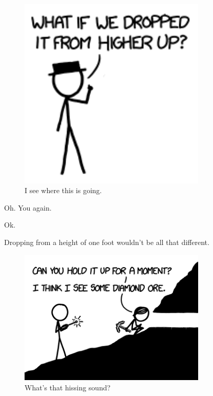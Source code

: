 {\begin{figure}[!htbp]
\centering
\includegraphics[scale=0.5, max width=0.8\textwidth]{imgs/a/57/mountain_hat.png}
\caption{I see where this is going.}
\end{figure}

{Oh. You again.}

{Ok.}

{Dropping from a height of one foot wouldn't be all that different.}

\begin{figure}[!htbp]
\centering
\includegraphics[scale=0.5, max width=0.8\textwidth]{imgs/a/57/mountain_foot.png}
\caption{What's that hissing sound?}
\end{figure}

}
